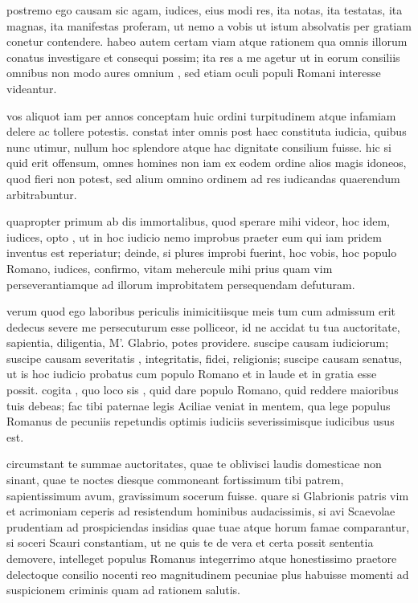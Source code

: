  postremo ego causam sic agam, iudices, eius modi res, ita notas, ita testatas, ita magnas, ita manifestas proferam, ut nemo a vobis ut istum absolvatis per gratiam conetur contendere. habeo autem certam viam atque rationem qua omnis illorum conatus investigare et consequi possim; ita res a me agetur ut in eorum consiliis omnibus non modo aures omnium , sed etiam oculi populi Romani interesse videantur.

 vos aliquot iam per annos conceptam huic ordini turpitudinem atque infamiam delere ac tollere potestis. constat inter omnis post haec constituta iudicia, quibus nunc utimur, nullum hoc splendore atque hac dignitate consilium fuisse. hic si quid erit offensum, omnes homines non iam ex eodem ordine alios magis idoneos, quod fieri non potest, sed alium omnino ordinem ad res iudicandas quaerendum arbitrabuntur.

 quapropter primum ab dis immortalibus, quod sperare mihi videor, hoc idem, iudices, opto , ut in hoc iudicio nemo improbus praeter eum qui iam pridem inventus est reperiatur; deinde, si plures improbi fuerint, hoc vobis, hoc populo Romano, iudices, confirmo, vitam mehercule mihi prius quam vim perseverantiamque ad illorum improbitatem persequendam defuturam.

 verum quod ego laboribus periculis inimicitiisque meis tum cum admissum erit dedecus severe me persecuturum esse polliceor, id ne accidat tu tua auctoritate, sapientia, diligentia, M'. Glabrio, potes providere. suscipe causam iudiciorum; suscipe causam severitatis , integritatis, fidei, religionis; suscipe causam senatus, ut is hoc iudicio probatus cum populo Romano et in laude et in gratia esse possit. cogita , quo loco sis , quid dare populo Romano, quid reddere maioribus tuis debeas; fac tibi paternae legis Aciliae veniat in mentem, qua lege populus Romanus de pecuniis repetundis optimis iudiciis severissimisque iudicibus usus est.

 circumstant te summae auctoritates, quae te oblivisci laudis domesticae non sinant, quae te noctes diesque commoneant fortissimum tibi patrem, sapientissimum avum, gravissimum socerum fuisse. quare si Glabrionis patris vim et acrimoniam ceperis ad resistendum hominibus audacissimis, si avi Scaevolae prudentiam ad prospiciendas insidias quae tuae atque horum famae comparantur, si soceri Scauri constantiam, ut ne quis te de vera et certa possit sententia demovere, intelleget populus Romanus integerrimo atque honestissimo praetore delectoque consilio nocenti reo magnitudinem pecuniae plus habuisse momenti ad suspicionem criminis quam ad rationem salutis.


